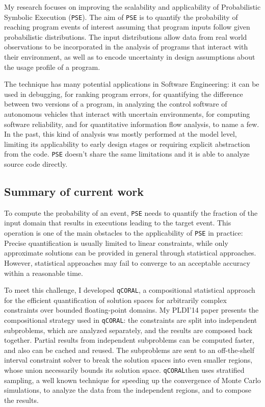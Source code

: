 \documentclass[12pt]{article}
\newcounter{list}
\begin{document}
\newcommand{\PSE}{\texttt{PSE}}
\newcommand{\qCORAL}{\texttt{qCORAL}}
\raisebox{1cm}

My research focuses on improving the scalability and applicability of
Probabilistic Symbolic Execution (\PSE{}). The aim of \PSE{}
\cite{borges2015iterative} is to quantify the probability of reaching
program events of interest assuming that program inputs follow given
probabilistic distributions. The input distributions allow data from
real world observations to be incorporated in the analysis of programs
that interact with their environment, as well as to encode uncertainty
in design assumptions about the usage profile of a program.

The technique has many potential applications in Software Engineering:
it can be used in debugging, for ranking program errors, for
quantifying the difference between two versions of a program, in
analyzing the control software of autonomous vehicles that interact
with uncertain environments, for computing software reliability, and
for quantitative information flow analysis, to name a few. In the
past, this kind of analysis was mostly performed at the model level,
limiting its applicability to early design stages or requiring
explicit abstraction from the code. \PSE{} doesn't share the same
limitations and it is able to analyze source code directly.

\subsection*{Summary of current work}

To compute the probability of an event, \PSE{} needs to quantify the
fraction of the input domain that results in executions leading to the
target event. This operation is one of the main obstacles to the
applicability of \PSE{} in practice: Precise quantification is usually
limited to linear constraints, while only approximate solutions can be
provided in general through statistical approaches. However,
statistical approaches may fail to converge to an acceptable accuracy
within a reasonable time.

To meet this challenge, I developed
\qCORAL\cite{borges2014compositional}, a compositional statistical
approach for the efficient quantification of solution spaces for
arbitrarily complex constraints over bounded floating-point
domains. My PLDI'14 paper presents the compositional strategy used in
\qCORAL: the constraints are split into independent subproblems, which
are analyzed separately, and the results are composed back
together. Partial results from independent subproblems can be computed
faster, and also can be cached and reused. The subproblems are sent to
an off-the-shelf interval constraint solver to break the solution
spaces into even smaller regions, whose union necessarily bounds its
solution space.  \qCORAL then uses stratified sampling, a well known
technique for speeding up the convergence of Monte Carlo simulations,
to analyze the data from the independent regions, and to compose the
results.
\end{document}
